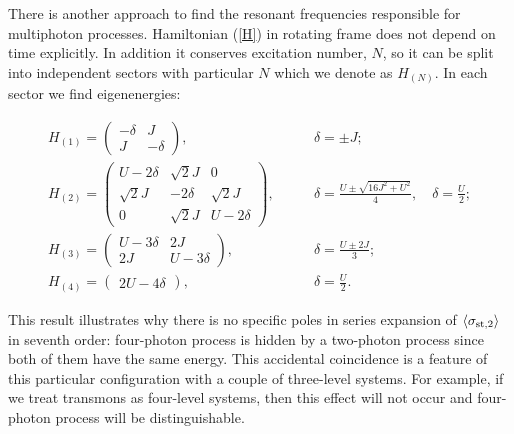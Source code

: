 \documentclass[%
 aps, pra,
 amsmath,amssymb,
 reprint,%
superscriptaddress
]{revtex4-2}
\begin{document}
There is another approach to find the resonant frequencies responsible for multiphoton processes. Hamiltonian (\ref{H}) in rotating frame does not depend on time explicitly. In addition it conserves excitation number, $N$, so it can be split into independent sectors with particular $N$ which we denote as $H_{(N)}$.
In each sector we find eigenenergies:
\begin{widetext}
$$
\begin{array}{ccc}
H_{(1)} = \begin{pmatrix}
-\delta & J
\\
J & -\delta
\end{pmatrix},
\qquad &
\delta = \pm J;
\\[1em]
H_{(2)} = \begin{pmatrix}
U - 2\delta & \sqrt{2} J & 0
\\
\sqrt{2} J & - 2\delta & \sqrt{2} J
\\
0 & \sqrt{2} J & U - 2 \delta
\end{pmatrix},
\qquad &
\displaystyle
\delta = \frac{U \pm \sqrt{16 J^2 + U^2}}{4}, \quad \delta = \frac{U}{2};
\\[2em]
H_{(3)} = \begin{pmatrix}
U - 3\delta & 2J
\\
2 J & U - 3 \delta
\end{pmatrix},
\qquad & \displaystyle
\delta = \frac{U \pm 2 J}{3};
\\[2em]
H_{(4)} = \begin{pmatrix}
2 U - 4\delta
\end{pmatrix},
\qquad & \displaystyle
\delta = \frac{U}{2}.
\end{array}
$$
\end{widetext}
This result illustrates why there is no specific poles in series expansion of $\langle\sigma_{{\rm st},2}\rangle$ in seventh order: four-photon process is hidden by a two-photon process since both of them have the same energy. This accidental coincidence is a feature of this particular configuration with a couple of three-level systems. For example, if we treat transmons as  four-level systems, then this effect will not occur and four-photon process will be distinguishable.






\end{document}
